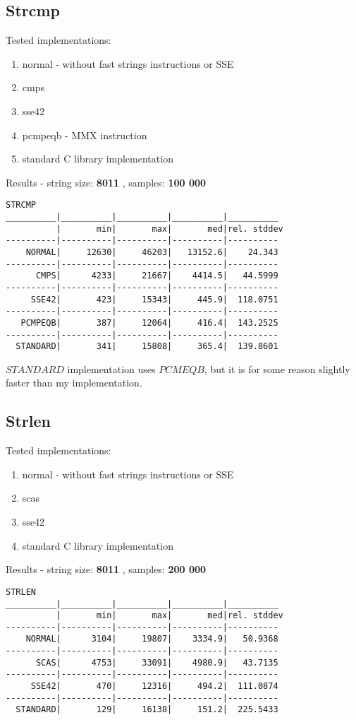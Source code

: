 \documentclass[11pt,a4paper]{article}
\begin{document}
\subsection{Strcmp}\label{subsec:strcmp}
    Tested implementations:
    \begin{enumerate}
        \item normal - without fast strings instructions or SSE
        \item cmps
        \item sse42
        \item pcmpeqb - MMX instruction
        \item standard C library implementation
    \end{enumerate}
Results - string size: \textbf{8011} , samples: \textbf{100 000}
\begin{lstlisting}[]
STRCMP
__________|__________|__________|__________|__________
          |       min|       max|       med|rel. stddev
----------|----------|----------|----------|----------
    NORMAL|     12630|     46203|   13152.6|    24.343
----------|----------|----------|----------|----------
      CMPS|      4233|     21667|    4414.5|   44.5999
----------|----------|----------|----------|----------
     SSE42|       423|     15343|     445.9|  118.0751
----------|----------|----------|----------|----------
   PCMPEQB|       387|     12064|     416.4|  143.2525
----------|----------|----------|----------|----------
  STANDARD|       341|     15808|     365.4|  139.8601
\end{lstlisting}
$STANDARD$ implementation uses $PCMEQB$, but it is for some reason slightly faster than my implementation.



\subsection{Strlen}\label{subsec:strlen}
    Tested implementations:
    \begin{enumerate}
        \item normal - without fast strings instructions or SSE
        \item scas
        \item sse42
        \item standard C library implementation
    \end{enumerate}
Results - string size: \textbf{8011} , samples: \textbf{200 000}
\begin{lstlisting}[]
STRLEN
__________|__________|__________|__________|__________
          |       min|       max|       med|rel. stddev
----------|----------|----------|----------|----------
    NORMAL|      3104|     19807|    3334.9|   50.9368
----------|----------|----------|----------|----------
      SCAS|      4753|     33091|    4980.9|   43.7135
----------|----------|----------|----------|----------
     SSE42|       470|     12316|     494.2|  111.0874
----------|----------|----------|----------|----------
  STANDARD|       129|     16138|     151.2|  225.5433
\end{lstlisting}
\end{document}
